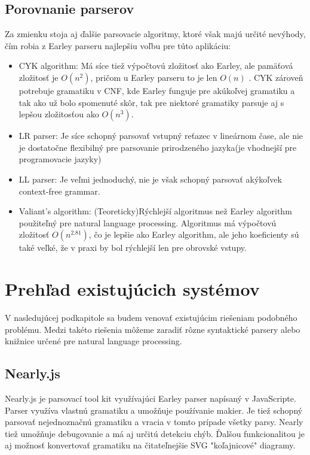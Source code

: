 \documentclass[12pt,a4paper]{report}
\theoremstyle{definition}
\theoremstyle{remark}
\begin{document}
\subsection{Porovnanie parserov}
Za zmienku stoja aj ďalšie parsovacie algoritmy, ktoré však majú určité nevýhody, čím robia z Earley parseru najlepšiu voľbu pre túto aplikáciu:
\begin{itemize}
\item CYK algorithm: Má síce tiež výpočtovú zložitosť ako Earley, ale pamäťová zložitosť je $O(n^2)$, pričom u Earley parseru to je len $O(n)$ \cite{complexity}. CYK zároveň potrebuje gramatiku v CNF, kde Earley funguje pre akúkoľvej gramatiku a tak ako už bolo spomenuté skôr, tak pre niektoré gramatiky parsuje aj s lepšou zložitosťou ako $O(n^3)$.
\item LR parser: Je síce schopný parsovať vstupný reťazec v lineárnom čase, ale nie je dostatočne flexibilný pre parsovanie prirodzeného jazyka(je vhodnejší pre programovacie jazyky)
\item LL parser: Je veľmi jednoduchý, nie je však schopný parsovať akýkoľvek context-free grammar.
\item Valiant’s algorithm: (Teoreticky)Rýchlejší algoritmus než Earley algorithm použiteľný pre natural language processing. Algoritmus má výpočtovú zložitosť $O(n^{2.81})$, čo je lepšie ako Earley algorithm, ale jeho koeficienty sú také veľké, že v praxi by bol rýchlejší len pre obrovské vstupy.\cite{Tomita}
\end{itemize}

\section{Prehľad existujúcich systémov}
V nasledujúcej podkapitole sa budem venovať existujúcim riešeniam podobného problému. Medzi takéto riešenia môžeme zaradiť rôzne syntaktické parsery alebo knižnice určené pre natural language processing.

\subsection{Nearly.js}
Nearly.js je parsovací tool kit využívajúci Earley parser napísaný v JavaScripte. Parser využíva vlastnú gramatiku a umožňuje používanie makier. Je tiež schopný parsovať nejednoznačnú gramatiku a vracia v tomto prípade všetky parsy. Nearly tiež umožňuje debugovanie a má aj určitú detekciu chýb. Ďalšou funkcionalitou je aj možnosť konvertovať gramatiku na čitateľnejšie SVG "koľajnicové" diagramy.
\end{document}
